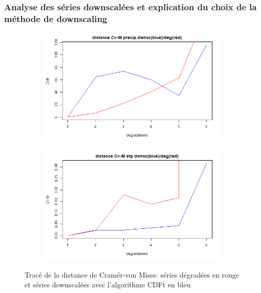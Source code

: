 \documentclass[a4paper,11pt]{article}
\numberwithin{equation}{section}
\begin{document}
\subsubsection{Analyse des séries downscalées et explication du choix de la méthode de downscaling}

\begin{figure}[H]
	\label{fig-res_CVM_CDFt}
	\centering
	\begin{subfigure}[b]{0.45\textwidth}
		\includegraphics[scale=0.4]{images/Dist_CVM_precip_CDFt.png}
	\end{subfigure}
	\hfill
	\begin{subfigure}[b]{0.45\textwidth}
		\includegraphics[scale=0.4]{images/Dist_CVM_evap_CDFt.png}
	\end{subfigure}
	\caption{Tracé de la distance de Cramér-von Mises: séries dégradées en rouge et séries downscalées avec l'algorithme CDFt en bleu}
\end{figure}
\end{document}
